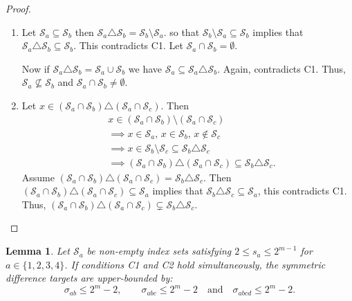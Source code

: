 \documentclass[10pt,a4paper]{amsart}
\newtheorem{lemma}{Lemma}
\begin{document}
\begin{proof}
\begin{enumerate}
    \item Let $\mathcal{S}_a \subseteq \mathcal{S}_b$ then  $\mathcal{S}_a \triangle \mathcal{S}_b = \mathcal{S}_b \setminus \mathcal{S}_a$. so that 
    $\mathcal{S}_b \setminus \mathcal{S}_a \subseteq \mathcal{S}_b$ implies that $\mathcal{S}_a \triangle \mathcal{S}_b \subseteq \mathcal{S}_b$. This contradicts  C1. 
    Let $\mathcal{S}_a \cap \mathcal{S}_b = \emptyset$.
    
    Now if  $\mathcal{S}_a \triangle \mathcal{S}_b = \mathcal{S}_a \cup \mathcal{S}_b$  we have  $\mathcal{S}_a \subseteq \mathcal{S}_a \triangle \mathcal{S}_b$. Again, contradicts  C1.
    Thus, $\mathcal{S}_a \not\subseteq \mathcal{S}_b$ and $\mathcal{S}_a \cap \mathcal{S}_b \neq \emptyset$.

    \item Let $x \in (\mathcal{S}_a \cap \mathcal{S}_b) \triangle (\mathcal{S}_a \cap \mathcal{S}_c)$. Then 
    \begin{align*}
    &x \in (\mathcal{S}_a \cap \mathcal{S}_b) \setminus (\mathcal{S}_a \cap \mathcal{S}_c)\\ 
    &\implies x \in \mathcal{S}_a, \, x \in \mathcal{S}_b, \, x \notin \mathcal{S}_c\\
    & \implies x \in \mathcal{S}_b \setminus \mathcal{S}_c \subseteq \mathcal{S}_b \triangle \mathcal{S}_c\\
    & \implies (\mathcal{S}_a \cap \mathcal{S}_b) \triangle (\mathcal{S}_a \cap \mathcal{S}_c) \subseteq \mathcal{S}_b \triangle \mathcal{S}_c.
    \end{align*}
    Assume $(\mathcal{S}_a \cap \mathcal{S}_b) \triangle (\mathcal{S}_a \cap \mathcal{S}_c) = \mathcal{S}_b \triangle \mathcal{S}_c$.
    Then $(\mathcal{S}_a \cap \mathcal{S}_b) \triangle (\mathcal{S}_a \cap \mathcal{S}_c) \subseteq \mathcal{S}_a$ implies that  $\mathcal{S}_b \triangle \mathcal{S}_c \subseteq \mathcal{S}_a$,  this contradicts  C1. Thus, $(\mathcal{S}_a \cap \mathcal{S}_b) \triangle (\mathcal{S}_a \cap \mathcal{S}_c) \subsetneq \mathcal{S}_b \triangle \mathcal{S}_c$.
\end{enumerate}
\end{proof}

\begin{lemma}\label{lem:bound_theory}
Let $\mathcal{S}_a$ be non-empty index sets satisfying $2 \leq s_a \leq 2^{m-1}$ for $a \in \{1,2,3,4\}$. If conditions C1 and C2 hold simultaneously, the symmetric difference targets are upper-bounded by:
\[
\sigma_{ab} \leq 2^m - 2, \quad \quad \sigma_{abc} \leq 2^m - 2 \quad \text{and} \quad \sigma_{abcd} \leq 2^m - 2.
\]
\end{lemma}
\end{document}
